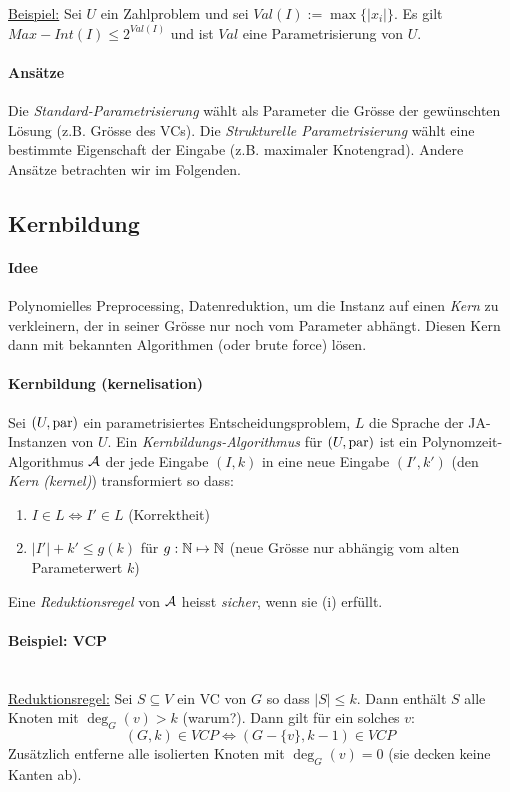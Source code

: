 \underline{Beispiel:}
Sei $U$ ein Zahlproblem und sei $Val(I) := \max \{ |x_i| \}$.
Es gilt $Max-Int(I) \leq 2^{Val(I)}$ und ist $Val$ eine Parametrisierung von $U$.

\paragraph{Ansätze}
Die \emph{Standard-Parametrisierung} wählt als Parameter die Grösse der gewünschten Lösung (z.B. Grösse des VCs).
Die \emph{Strukturelle Parametrisierung} wählt eine bestimmte Eigenschaft der Eingabe (z.B. maximaler Knotengrad).
Andere Ansätze betrachten wir im Folgenden.


\subsection{Kernbildung}

\paragraph{Idee}
Polynomielles Preprocessing, Datenreduktion, um die Instanz auf einen \emph{Kern} zu verkleinern,
der in seiner Grösse nur noch vom Parameter abhängt.
Diesen Kern dann mit bekannten Algorithmen (oder brute force) lösen.

\paragraph{Kernbildung (kernelisation)}
Sei $(U, \text{par})$ ein parametrisiertes Entscheidungsproblem, $L$ die Sprache der JA-Instanzen von $U$.
Ein \emph{Kernbildungs-Algorithmus} für $(U, \text{par})$ ist ein Polynomzeit-Algorithmus $\mathcal{A}$ der jede Eingabe $(I, k)$
in eine neue Eingabe $(I', k')$ (den \emph{Kern (kernel)}) transformiert so dass:
\begin{enumerate}[label=(\roman*)]
    \item $ I \in L \iff I' \in L $ (Korrektheit)
    \item $ |I'| + k' \leq g(k) $ für $g : \mathbb{N} \mapsto \mathbb{N}$ (neue Grösse nur abhängig vom alten Parameterwert $k$)
\end{enumerate}

Eine \emph{Reduktionsregel} von $\mathcal{A}$ heisst \emph{sicher}, wenn sie (i) erfüllt.

\paragraph{Beispiel: VCP} \mbox{} \\
\underline{Reduktionsregel:}
Sei $S \subseteq V$ ein VC von $G$ so dass $|S| \leq k$. Dann enthält $S$ alle Knoten mit $\deg_G(v) > k$ (warum?).
Dann gilt für ein solches $v$:
$$ (G, k) \in VCP \iff (G-\{v\}, k-1) \in VCP $$
Zusätzlich entferne alle isolierten Knoten mit $\deg_G(v) = 0$ (sie decken keine Kanten ab).


